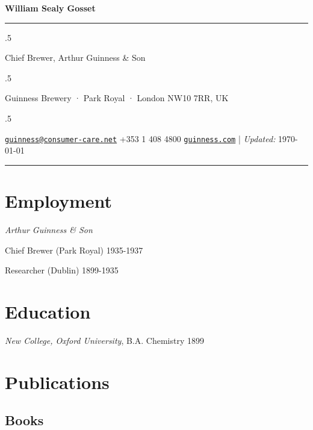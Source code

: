 \documentclass[11pt,]{article}
\begin{document}
\centerline{\huge \bf William Sealy Gosset}

\vspace{2 mm}

\hrule

\vspace{2 mm}

\moveleft.5\hoffset\centerline{Chief Brewer, Arthur Guinness \& Son}
\moveleft.5\hoffset\centerline{Guinness Brewery · Park Royal · London NW10 7RR, UK}
\moveleft.5\hoffset\centerline{ \faEnvelopeO \hspace{1 mm} \href{mailto:}{\tt \href{mailto:guinness@consumer-care.net}{\nolinkurl{guinness@consumer-care.net}}} \hspace{1 mm}  \faPhone \hspace{1 mm}  +353 1 408 4800  \hspace{1 mm}      \faGlobe \hspace{1 mm} \href{http://guinness.com}{\tt guinness.com}    | \emph{Updated:} \apstylekinda\today} 

\vspace{2 mm}

\hrule


\hypertarget{employment}{%
\section{Employment}\label{employment}}

\emph{Arthur Guinness \& Son}

Chief Brewer (Park Royal) \hfill 1935-1937

Researcher (Dublin) \hfill 1899-1935

\hypertarget{education}{%
\section{Education}\label{education}}

\emph{New College, Oxford University}, B.A. Chemistry \hfill 1899

\hypertarget{publications}{%
\section{Publications}\label{publications}}

\hypertarget{books}{%
\subsection{Books}\label{books}}
\end{document}
